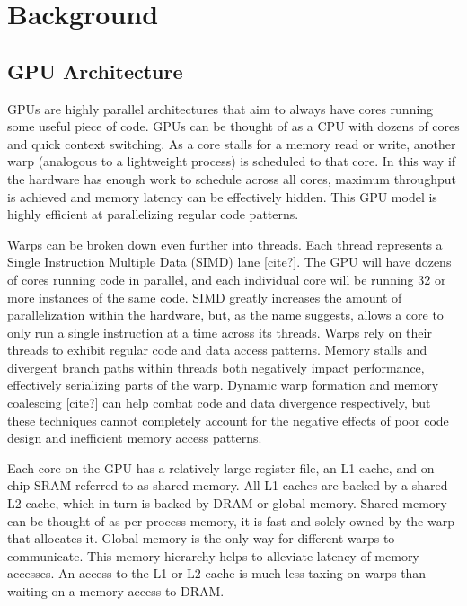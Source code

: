 \chapter{Background}

\section{GPU Architecture}
GPUs are highly parallel architectures that aim to always have cores running some useful piece of code. GPUs can be thought of as a CPU with dozens of cores and quick context switching. As a core stalls for a memory read or write, another warp (analogous to a lightweight process) is scheduled to that core. In this way if the hardware has enough work to schedule across all cores, maximum throughput is achieved and memory latency can be effectively hidden. This GPU model is highly efficient at parallelizing regular code patterns.

Warps can be broken down even further into threads. Each thread represents a Single Instruction Multiple Data (SIMD) lane [cite?]. The GPU will have dozens of cores running code in parallel, and each individual core will be running 32 or more instances of the same code. SIMD greatly increases the amount of parallelization within the hardware, but, as the name suggests, allows a core to only run a single instruction at a time across its threads. Warps rely on their threads to exhibit regular code and data access patterns. Memory stalls and divergent branch paths within threads both negatively impact performance, effectively serializing parts of the warp. Dynamic warp formation \cite{dynamicwarp1,dynamicwarp2} and memory coalescing [cite?] can help combat code and data divergence respectively, but these techniques cannot completely account for the negative effects of poor code design and inefficient memory access patterns.

Each core on the GPU has a relatively large register file, an L1 cache, and on chip SRAM referred to as shared memory. All L1 caches are backed by a shared L2 cache, which in turn is backed by DRAM or global memory. Shared memory can be thought of as per-process memory, it is fast and solely owned by the warp that allocates it. Global memory is the only way for different warps to communicate. This memory hierarchy helps to alleviate latency of memory accesses. An access to the L1 or L2 cache is much less taxing on warps than waiting on a memory access to DRAM.

